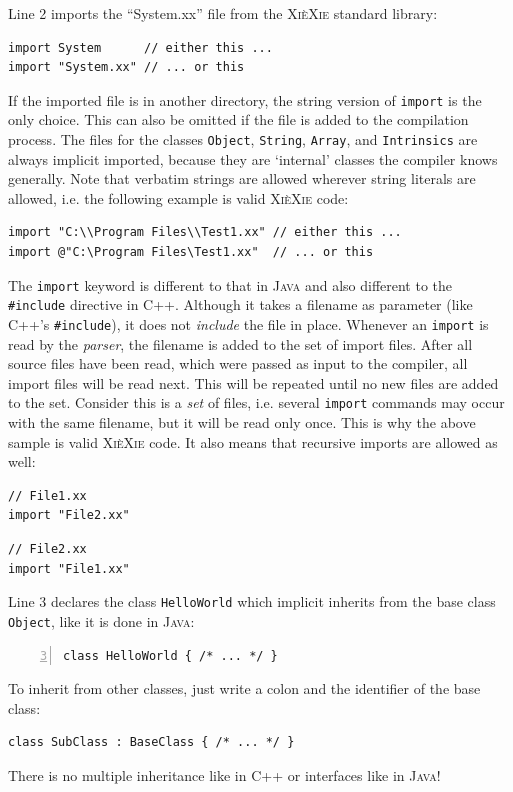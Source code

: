 \documentclass[a5paper]{report}
\def\xiexie{\textsc{Xi\`eXie}\xspace}
\def\cpp{\textsc{C++}\xspace}
\def\java{\textsc{Java}\xspace}
\begin{document}
Line 2 imports the ``System.xx'' file from the \xiexie standard library:
\begin{lstlisting}
import System      // either this ...
import "System.xx" // ... or this
\end{lstlisting}
If the imported file is in another directory, the string version of \texttt{import} is the only choice.
This can also be omitted if the file is added to the compilation process.
The files for the classes \texttt{Object}, \texttt{String}, \texttt{Array}, and \texttt{Intrinsics}
are always implicit imported, because they are `internal' classes the compiler knows generally.
Note that verbatim strings are allowed wherever string literals are allowed, i.e. the following example is valid \xiexie code:
\begin{lstlisting}
import "C:\\Program Files\\Test1.xx" // either this ...
import @"C:\Program Files\Test1.xx"  // ... or this
\end{lstlisting}
The \texttt{import} keyword is different to that in \java and also different to the \texttt{\#include} directive in \cpp.
Although it takes a filename as parameter (like \cpp's \texttt{\#include}), it does not \textit{include} the file in place.
Whenever an \texttt{import} is read by the \textit{parser}, the filename is added to the set of import files.
After all source files have been read, which were passed as input to the compiler, all import files will be read next.
This will be repeated until no new files are added to the set.
Consider this is a \textit{set} of files, i.e. several \texttt{import} commands may occur with the same filename,
but it will be read only once. This is why the above sample is valid \xiexie code. It also means that recursive imports
are allowed as well:
\begin{lstlisting}
// File1.xx
import "File2.xx"
\end{lstlisting}
\begin{lstlisting}
// File2.xx
import "File1.xx"
\end{lstlisting}

Line 3 declares the class \texttt{HelloWorld} which implicit inherits from the base class \texttt{Object},
like it is done in \java:
\begin{lstlisting}[numbers=left, firstnumber=3]
class HelloWorld { /* ... */ }
\end{lstlisting}
To inherit from other classes, just write a colon and the identifier of the base class:
\begin{lstlisting}
class SubClass : BaseClass { /* ... */ }
\end{lstlisting}
There is no multiple inheritance like in \cpp or interfaces like in \java!
\end{document}
